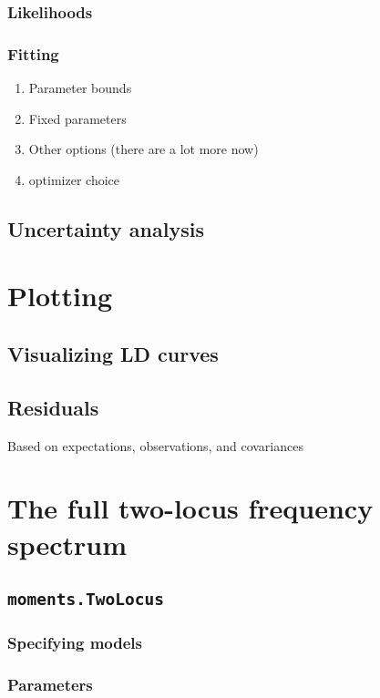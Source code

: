 \documentclass[11pt]{article}
\begin{document}
\subsubsection{Likelihoods}


\subsubsection{Fitting}

\begin{enumerate}
\item Parameter bounds
\item Fixed parameters
\item Other options (there are a lot more now)
\item optimizer choice
\end{enumerate}

\subsection{Uncertainty analysis}


\section{Plotting}

\subsection{Visualizing LD curves}


\subsection{Residuals}
Based on expectations, observations, and covariances


\section{The full two-locus frequency spectrum}

\subsection{\texttt{moments.TwoLocus}}

\subsubsection{Specifying models}

\subsubsection{Parameters}
\end{document}
